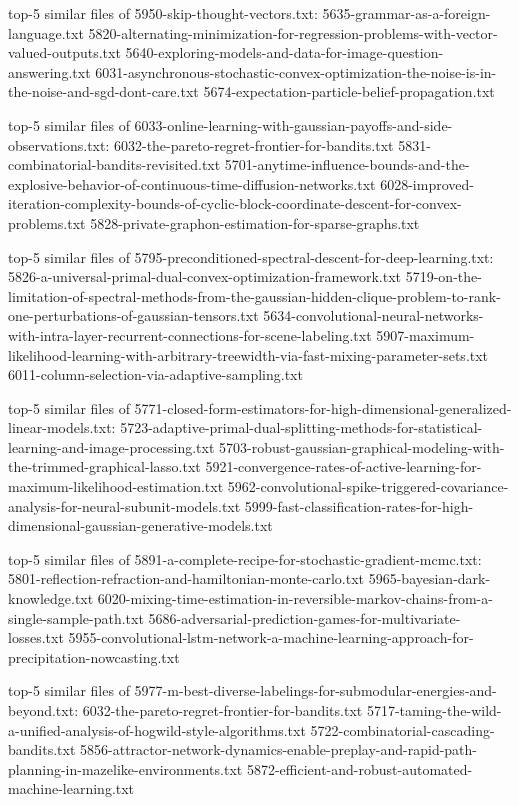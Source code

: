 \documentclass[11pt]{article}
\begin{document}
top-5 similar files of 5950-skip-thought-vectors.txt:
5635-grammar-as-a-foreign-language.txt
5820-alternating-minimization-for-regression-problems-with-vector-valued-outputs.txt
5640-exploring-models-and-data-for-image-question-answering.txt
6031-asynchronous-stochastic-convex-optimization-the-noise-is-in-the-noise-and-sgd-dont-care.txt
5674-expectation-particle-belief-propagation.txt

top-5 similar files of
6033-online-learning-with-gaussian-payoffs-and-side-observations.txt:
6032-the-pareto-regret-frontier-for-bandits.txt
5831-combinatorial-bandits-revisited.txt
5701-anytime-influence-bounds-and-the-explosive-behavior-of-continuous-time-diffusion-networks.txt
6028-improved-iteration-complexity-bounds-of-cyclic-block-coordinate-descent-for-convex-problems.txt
5828-private-graphon-estimation-for-sparse-graphs.txt

top-5 similar files of
5795-preconditioned-spectral-descent-for-deep-learning.txt:
5826-a-universal-primal-dual-convex-optimization-framework.txt
5719-on-the-limitation-of-spectral-methods-from-the-gaussian-hidden-clique-problem-to-rank-one-perturbations-of-gaussian-tensors.txt
5634-convolutional-neural-networks-with-intra-layer-recurrent-connections-for-scene-labeling.txt
5907-maximum-likelihood-learning-with-arbitrary-treewidth-via-fast-mixing-parameter-sets.txt
6011-column-selection-via-adaptive-sampling.txt

top-5 similar files of
5771-closed-form-estimators-for-high-dimensional-generalized-linear-models.txt:
5723-adaptive-primal-dual-splitting-methods-for-statistical-learning-and-image-processing.txt
5703-robust-gaussian-graphical-modeling-with-the-trimmed-graphical-lasso.txt
5921-convergence-rates-of-active-learning-for-maximum-likelihood-estimation.txt
5962-convolutional-spike-triggered-covariance-analysis-for-neural-subunit-models.txt
5999-fast-classification-rates-for-high-dimensional-gaussian-generative-models.txt

top-5 similar files of
5891-a-complete-recipe-for-stochastic-gradient-mcmc.txt:
5801-reflection-refraction-and-hamiltonian-monte-carlo.txt
5965-bayesian-dark-knowledge.txt
6020-mixing-time-estimation-in-reversible-markov-chains-from-a-single-sample-path.txt
5686-adversarial-prediction-games-for-multivariate-losses.txt
5955-convolutional-lstm-network-a-machine-learning-approach-for-precipitation-nowcasting.txt

top-5 similar files of
5977-m-best-diverse-labelings-for-submodular-energies-and-beyond.txt:
6032-the-pareto-regret-frontier-for-bandits.txt
5717-taming-the-wild-a-unified-analysis-of-hogwild-style-algorithms.txt
5722-combinatorial-cascading-bandits.txt
5856-attractor-network-dynamics-enable-preplay-and-rapid-path-planning-in-mazelike-environments.txt
5872-efficient-and-robust-automated-machine-learning.txt
\end{document}
